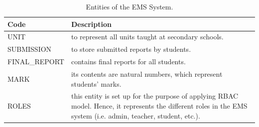 \begin{table}[bth]
\centering
\caption{Entities of the EMS System.}
\small
{}
\begin{tabular}{p{0.8 in} p{6 in}} \hline 
\hline
Code & Description\\\hline\hline

UNIT& to represent all units taught at secondary schools. \\ 
SUBMISSION& to store submitted reports by students. \\ 
FINAL\_REPORT& contains final reports for all students. \\ 
MARK& its contents are natural numbers, which represent students' marks. \\ 
ROLES& this entity is set up for the purpose of applying RBAC model.  Hence, it represents the different roles in the EMS system (i.e. admin, teacher, student, etc.).\\ \hline\hline
\end{tabular}
\label{tab:otherentities}
\end{table}




